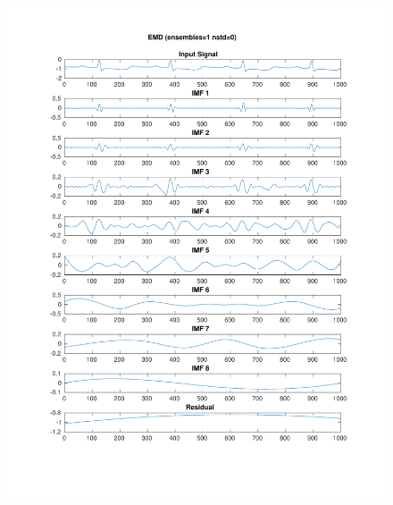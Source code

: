 \documentclass[11pt,a4paper]{article}
\begin{document}
\begin{figure}[H]
\centering
\begin{minipage}{0.48\textwidth}
	\centering
	\includegraphics[width=\textwidth]{fig/112l1_emd.pdf}
	

\end{minipage}
\end{figure}
\end{document}
